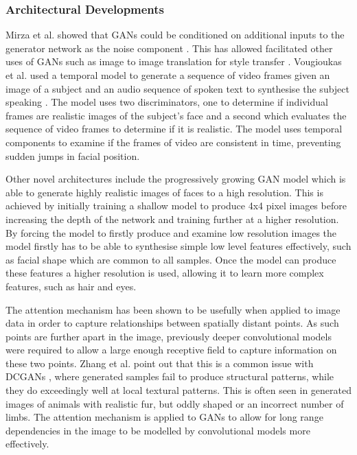 \documentclass[12pt]{article}
\begin{document}
\subsubsection{Architectural Developments}
Mirza et al. showed that GANs could be conditioned on additional inputs to the generator network as the noise component \cite{Mirza2014}.
This has allowed facilitated other uses of GANs such as image to image translation for style transfer \cite{Zhu2017}.
Vougioukas et al. used a temporal model to generate a sequence of video frames given an image of a subject and an audio sequence of spoken text to synthesise the subject speaking \cite{Vougioukas2018}.
The model uses two discriminators, one to determine if individual frames are realistic images of the subject's face and a second which evaluates the sequence of video frames to determine if it is realistic.
The model uses temporal components to examine if the frames of video are consistent in time, preventing sudden jumps in facial position.

Other novel architectures include the progressively growing GAN model \cite{Karras2017b} which is able to generate highly realistic images of faces to a high resolution.
This is achieved by initially training a shallow model to produce 4x4 pixel images before increasing the depth of the network and training further at a higher resolution.
By forcing the model to firstly produce and examine low resolution images the model firstly has to be able to synthesise simple low level features effectively, such as facial shape which are common to all samples.
Once the model can produce these features a higher resolution is used, allowing it to learn more complex features, such as hair and eyes.

The attention mechanism \cite{Vaswani2017} has been shown to be usefully when applied to image data \cite{Xu2015} in order to capture relationships between spatially distant points.
As such points are further apart in the image, previously deeper convolutional models were required to allow a large enough receptive field to capture information on these two points.
Zhang et al. point out that this is a common issue with DCGANs \cite{Radford2016}, where generated samples fail to produce structural patterns, while they do exceedingly well at local textural patterns.
This is often seen in generated images of animals with realistic fur, but oddly shaped or an incorrect number of limbs.
The attention mechanism is applied to GANs \cite{Zhang2018} to allow for long range dependencies in the image to be modelled by convolutional models more effectively.
\end{document}
